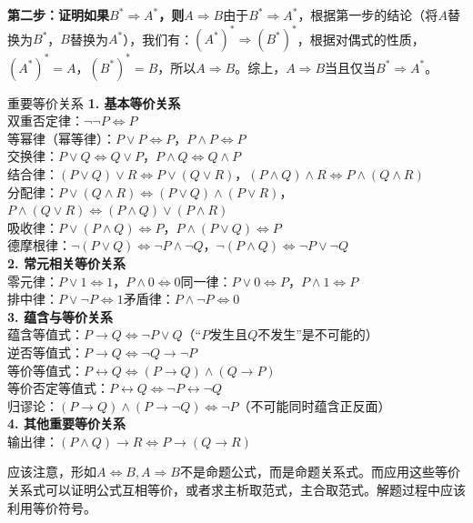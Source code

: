 \documentclass[lang=cn,11pt]{elegantbook}
\begin{document}
\textbf{第二步：证明如果$B^* \Rightarrow A^*$，则$A \Rightarrow B$}由于$B^* \Rightarrow A^*$，根据第一步的结论（将$A$替换为$B^*$，$B$替换为$A^*$），我们有：$(A^*)^* \Rightarrow (B^*)^*$，根据对偶式的性质，$(A^*)^* = A$，$(B^*)^* = B$，所以$A \Rightarrow B$。综上，$A \Rightarrow B$当且仅当$B^* \Rightarrow A^*$。
\begin{theorem}{重要等价关系}
\noindent\textbf{1. 基本等价关系}\\
双重否定律：$\neg\neg P \Leftrightarrow P$\\
等幂律（幂等律）：$P \lor P \Leftrightarrow P$，$P \land P \Leftrightarrow P$\\
交换律：$P \lor Q \Leftrightarrow Q \lor P$，$P \land Q \Leftrightarrow Q \land P$\\
结合律：$(P \lor Q) \lor R \Leftrightarrow P \lor (Q \lor R)$，$(P \land Q) \land R \Leftrightarrow P \land (Q \land R)$\\
分配律：$P \lor (Q \land R) \Leftrightarrow (P \lor Q) \land (P \lor R)$，$P \land (Q \lor R) \Leftrightarrow (P \land Q) \lor (P \land R)$\\
吸收律：$P \lor (P \land Q) \Leftrightarrow P$，$P \land (P \lor Q) \Leftrightarrow P$\\
德摩根律：$\neg(P \lor Q) \Leftrightarrow \neg P \land \neg Q$，$\neg(P \land Q) \Leftrightarrow \neg P \lor \neg Q$\\
\noindent\textbf{2. 常元相关等价关系}\\
零元律：$P \lor 1 \Leftrightarrow 1$，$P \land 0 \Leftrightarrow 0$\quad 同一律：$P \lor 0 \Leftrightarrow P$，$P \land 1 \Leftrightarrow P$\\
排中律：$P \lor \neg P \Leftrightarrow 1$\quad 矛盾律：$P \land \neg P \Leftrightarrow 0$\\
\noindent\textbf{3. 蕴含与等价关系}\\
蕴含等值式：$P \rightarrow Q \Leftrightarrow \neg P \lor Q$（“$P$发生且$Q$不发生”是不可能的）\\
逆否等值式：$P \rightarrow Q \Leftrightarrow \neg Q \rightarrow \neg P$\\
等价等值式：$P \leftrightarrow Q \Leftrightarrow (P \rightarrow Q) \land (Q \rightarrow P)$\\
等价否定等值式：$P \leftrightarrow Q \Leftrightarrow \neg P \leftrightarrow \neg Q$\\
归谬论：$(P \rightarrow Q) \land (P \rightarrow \neg Q) \Leftrightarrow \neg P$（不可能同时蕴含正反面）\\
\noindent\textbf{4. 其他重要等价关系}\\
输出律：$(P \land Q) \rightarrow R \Leftrightarrow P \rightarrow (Q \rightarrow R)$
\end{theorem}
应该注意，形如$A\Leftrightarrow B,A\Rightarrow B$不是命题公式，而是命题关系式。而应用这些等价关系式可以证明公式互相等价，或者求主析取范式，主合取范式。解题过程中应该利用等价符号。
\end{document}
